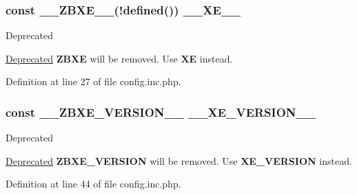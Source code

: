 \subsubsection[{\+\_\+\+\_\+\+Z\+B\+X\+E\+\_\+\+\_\+}]{\setlength{\rightskip}{0pt plus 5cm}const \+\_\+\+\_\+\+Z\+B\+X\+E\+\_\+\+\_\+(!defined(\textquotesingle{})) {\bf \+\_\+\+\_\+\+X\+E\+\_\+\+\_\+}}\label{config_8inc_8php_a5dee6469b95523a5bafe17e6b29c6bf7}
\begin{DoxyRefDesc}{Deprecated}
\item[\hyperlink{deprecated__deprecated000011}{Deprecated}]{\bfseries Z\+B\+X\+E} will be removed. Use {\bfseries X\+E} instead. \end{DoxyRefDesc}


Definition at line 27 of file config.\+inc.\+php.

\hypertarget{config_8inc_8php_a0e70c145bf3712e075af5c3861045dc9}{}
\subsubsection[{\+\_\+\+\_\+\+Z\+B\+X\+E\+\_\+\+V\+E\+R\+S\+I\+O\+N\+\_\+\+\_\+}]{\setlength{\rightskip}{0pt plus 5cm}const \+\_\+\+\_\+\+Z\+B\+X\+E\+\_\+\+V\+E\+R\+S\+I\+O\+N\+\_\+\+\_\+ {\bf \+\_\+\+\_\+\+X\+E\+\_\+\+V\+E\+R\+S\+I\+O\+N\+\_\+\+\_\+}}\label{config_8inc_8php_a0e70c145bf3712e075af5c3861045dc9}
\begin{DoxyRefDesc}{Deprecated}
\item[\hyperlink{deprecated__deprecated000012}{Deprecated}]{\bfseries Z\+B\+X\+E\+\_\+\+V\+E\+R\+S\+I\+O\+N} will be removed. Use {\bfseries X\+E\+\_\+\+V\+E\+R\+S\+I\+O\+N} instead. \end{DoxyRefDesc}


Definition at line 44 of file config.\+inc.\+php.

\hypertarget{config_8inc_8php_a22df32d3e0eae0d60d6cddb9ec99d5ec}{}
